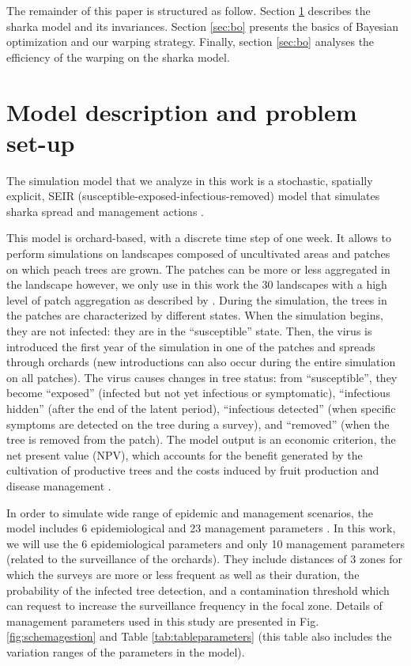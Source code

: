 	The remainder of this paper is structured as follow. Section \ref{sec:model} describes the sharka model and its invariances.
	Section \ref{sec:bo} presents the basics of Bayesian optimization and our warping strategy. Finally, section \ref{sec:bo}
	analyses the efficiency of the warping on the sharka model.
	
	\section{Model description and problem set-up}\label{sec:model}
	
	The simulation model that we analyze in this work is a stochastic, spatially explicit, SEIR (susceptible-exposed-infectious-removed) model that simulates sharka spread and management actions 
	\citep[including surveillance, removals and replantations][]{pleydell2018estimation,rimbaud2018using,rimbaud2018heuristic}.
	
	This model is orchard-based, with a discrete time step of one week. It allows to perform simulations on landscapes composed of uncultivated areas and patches on which peach trees are grown. 
	The patches can be more or less aggregated in the landscape however, we only use in this work the 30 landscapes with a high level of patch aggregation as described by \cite{picard2018}. 
	During the simulation, the trees in the patches are characterized by different states. When the simulation begins, they are not infected: they are in the ``susceptible'' state. 
	Then, the virus is introduced the first year of the simulation in one of the patches and spreads through orchards (new introductions can also occur during the entire simulation on all patches).
	The virus causes changes in tree status: from ``susceptible'', they become ``exposed'' (infected but not yet infectious or symptomatic), ``infectious hidden'' (after the end of the latent period), 
	``infectious detected'' (when specific symptoms are detected on the tree during a survey), and ``removed'' (when the tree is removed from the patch). 
	The model output is an economic criterion, the net present value (NPV), which accounts for the benefit generated by the cultivation of productive trees 
	and the costs induced by fruit production and disease management \cite{rimbaud2018heuristic}.
	
	In order to simulate wide range of epidemic and management scenarios, the model includes 6 epidemiological and 23 management parameters \cite{rimbaud2018heuristic,picard2018}. 
	In this work, we will use the 6 epidemiological parameters and only 10 management parameters (related to the surveillance of the orchards). 
	They include distances of 3 zones for which the surveys are more or less frequent as well as their duration, the probability of the infected tree detection, 
	and a contamination threshold which can request to increase the surveillance frequency in the focal zone. 
	Details of management parameters used in this study are presented in Fig.\ref{fig:schemagestion} and Table \ref{tab:tableparameters} 
	(this table also includes the variation ranges of the parameters in the model).
	
